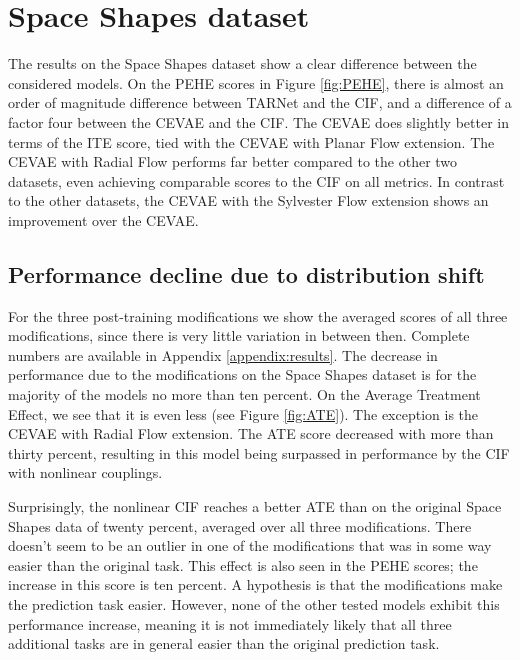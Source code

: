 \documentclass{report}
\begin{document}
\section{Space Shapes dataset}
The results on the Space Shapes dataset show a clear difference between the considered models. On the PEHE scores in Figure \ref{fig:PEHE}, there is almost an order of magnitude difference between TARNet and the CIF, and a difference of a factor four between the CEVAE and the CIF. The CEVAE does slightly better in terms of the ITE score, tied with the CEVAE with Planar Flow extension. The CEVAE with Radial Flow performs far better compared to the other two datasets, even achieving comparable scores to the CIF on all metrics. In contrast to the other datasets, the CEVAE with the Sylvester Flow extension shows an improvement over the CEVAE.


\subsection{Performance decline due to distribution shift}\label{section:res_space_mod}
For the three post-training modifications we show the averaged scores of all three modifications, since there is very little variation in between then. Complete numbers are available in Appendix \ref{appendix:results}. The decrease in performance due to the modifications on the Space Shapes dataset is for the majority of the models no more than ten percent. On the Average Treatment Effect, we see that it is even less (see Figure \ref{fig:ATE}). The exception is the CEVAE with Radial Flow extension. The ATE score decreased with more than thirty percent, resulting in this model being surpassed in performance by the CIF with nonlinear couplings.

Surprisingly, the nonlinear CIF reaches a better ATE than on the original Space Shapes data of twenty percent, averaged over all three modifications. There doesn't seem to be an outlier in one of the modifications that was in some way easier than the original task. This effect is also seen in the PEHE scores; the increase in this score is ten percent. A hypothesis is that the modifications make the prediction task easier. However, none of the other tested models exhibit this performance increase, meaning it is not immediately likely that all three additional tasks are in general easier than the original prediction task.
\end{document}
